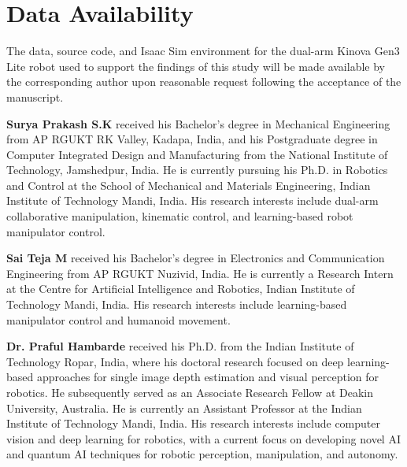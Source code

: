 \documentclass[a4paper,fleqn]{cas-dc}
\begin{document}
\section*{Data Availability}
The data, source code, and Isaac Sim environment for the dual-arm Kinova Gen3 Lite robot used to support the findings of this study will be made available by the corresponding author upon reasonable request following the acceptance of the manuscript.
%






\bio{}
\textbf{Surya Prakash S.K} received his Bachelor's degree in Mechanical Engineering from AP RGUKT RK Valley, Kadapa, India, and his Postgraduate degree in Computer Integrated Design and Manufacturing from the National Institute of Technology, Jamshedpur, India. He is currently pursuing his Ph.D. in Robotics and Control at the School of Mechanical and Materials Engineering, Indian Institute of Technology Mandi, India. His research interests include dual-arm collaborative manipulation, kinematic control, and learning-based robot manipulator control.
\endbio

\bio{}
\textbf{Sai Teja M} received his Bachelor's degree in Electronics and Communication Engineering from AP RGUKT Nuzivid, India. He is currently a Research Intern at the Centre for Artificial Intelligence and Robotics, Indian Institute of Technology Mandi, India. His research interests include learning-based manipulator control and humanoid movement.
\endbio

\bio{}
\textbf{Dr. Praful Hambarde} received his Ph.D. from the Indian Institute of Technology Ropar, India, where his doctoral research focused on deep learning-based approaches for single image depth estimation and visual perception for robotics. He subsequently served as an Associate Research Fellow at Deakin University, Australia. He is currently an Assistant Professor at the Indian Institute of Technology Mandi, India. His research interests include computer vision and deep learning for robotics, with a current focus on developing novel AI and quantum AI techniques for robotic perception, manipulation, and autonomy.
\endbio
\end{document}
